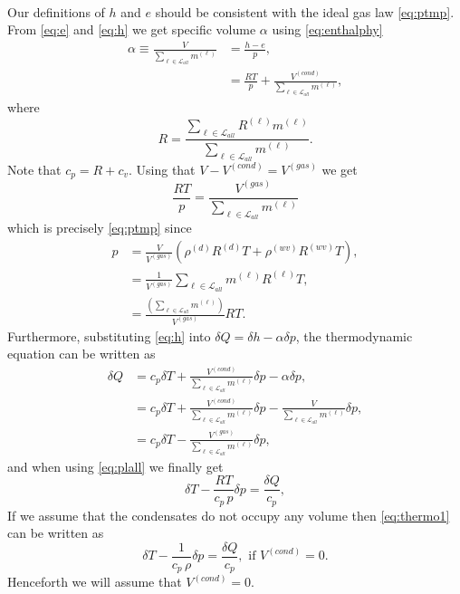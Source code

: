 \documentclass{agujournal}
\begin{document}
{\begin{align}
\end{align}
Our definitions of $h$ and $e$ should be consistent with the ideal gas law \eqref{eq:ptmp}. From \eqref{eq:e} and \eqref{eq:h} we get specific volume $\alpha$ using \eqref{eq:enthalphy}
\begin{align}
\alpha \equiv \frac{V}{\sum_{\ell \in \mathcal{L}_{all}}m^{(\ell)}} &=\frac{h-e}{p},\\
      &=\frac{RT}{p}+\frac{V^{(cond)}}{\sum_{\ell \in \mathcal{L}_{all}} m^{(\ell)}},\label{eq:tmpalpha}
\end{align}
where
\begin{equation}
R  =\frac{\sum_{\ell \in \mathcal{L}_{all}} R^{(\ell)} m^{(\ell)}}{\sum_{\ell \in \mathcal{L}_{all}} m^{(\ell)}}.
\end{equation}
Note that $c_p=R+c_v$. Using that $V-V^{(cond)}=V^{(gas)}$ we get
\begin{equation}
\frac{RT}{p}=\frac{V^{(gas)}}{\sum_{\ell \in \mathcal{L}_{all}} m^{(\ell)}}
\end{equation}
which is precisely \eqref{eq:ptmp} since
\begin{align}
p&=\frac{V}{V^{(gas)}}\left( \rho^{(d)}R^{(d)}T+\rho^{(wv)}R^{(wv)}T\right),\\
 &=\frac{1}{V^{(gas)}}\sum_{\ell \in \mathcal{L}_{all}}m^{(\ell)}R^{(\ell)}T,\\
 &=\frac{\left(\sum_{\ell \in \mathcal{L}_{all}}m^{(\ell)}\right)}{V^{(gas)}}RT.\label{eq:plall}
\end{align}
Furthermore, substituting \eqref{eq:h} into $\delta Q=\delta h-\alpha \delta p$, the thermodynamic equation can be written as
\begin{align}
\delta Q&=c_p\delta T+\frac{V^{(cond)}}{\sum_{\ell \in \mathcal{L}_{all}}m^{(\ell)}}\delta p-\alpha \delta p,\\
        &=c_p\delta T+\frac{V^{(cond)}}{\sum_{\ell \in \mathcal{L}_{all}}m^{(\ell)}}\delta p-\frac{V}{\sum_{\ell \in \mathcal{L}_{all}}m^{(\ell)}} \delta p,\\
        &=c_p\delta T-\frac{V^{(gas)}}{\sum_{\ell \in \mathcal{L}_{all}}m^{(\ell)}}\delta p,
\end{align}
and when using \eqref{eq:plall} we finally get
\begin{equation}
\delta T-\frac{RT}{c_p\, p}\delta p=\frac{\delta Q}{c_p},\label{eq:thermo1}
\end{equation}
If we assume that the condensates do not occupy any volume then \eqref{eq:thermo1} can be written as
\begin{equation}
\delta T-\frac{1}{c_p\, \rho}\delta p=\frac{\delta Q}{c_p},\text{ if }V^{(cond)}=0.\label{eq:thermo2}
\end{equation}
Henceforth we will assume that $V^{(cond)}=0$.

}
\end{document}
